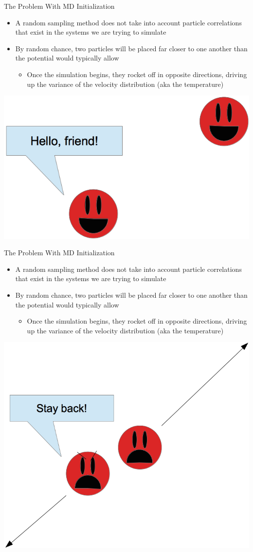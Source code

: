 \documentclass{beamer}
\begin{document}
	\begin{frame}{The Problem With MD Initialization}
	\begin{itemize}
	\item A random sampling method does not take into account particle correlations that exist in the systems we are trying to simulate
	\vspace{0.5em}
	\item By random chance, two particles will be placed far closer to one another than the potential would typically allow
	\vspace{0.5em}
	\begin{itemize}
	\item Once the simulation begins, they rocket off in opposite directions, driving up the variance of the velocity distribution (aka the temperature)
	\end{itemize}
	\end{itemize}
	
	\begin{center}\includegraphics[width=0.4\linewidth]{happyparticles.png}\end{center}
	\end{frame}
	
	\begin{frame}{The Problem With MD Initialization}
	\begin{itemize}
	\item A random sampling method does not take into account particle correlations that exist in the systems we are trying to simulate
	\vspace{0.5em}
	\item By random chance, two particles will be placed far closer to one another than the potential would typically allow
	\vspace{0.5em}
	\begin{itemize}
	\item Once the simulation begins, they rocket off in opposite directions, driving up the variance of the velocity distribution (aka the temperature)
	\end{itemize}
	\end{itemize}
	
	\begin{center}\includegraphics[width=0.4\linewidth]{unhappyparticles.png}\end{center}
	\end{frame}
	
\end{document}
